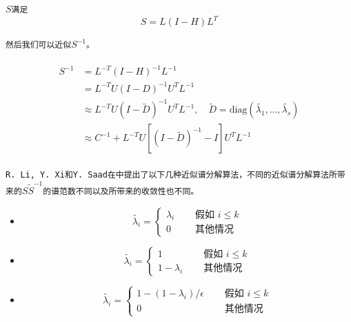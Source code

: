 \documentclass[11pt, a4paper]{article}
\theoremstyle{plain}
\theoremstyle{plain}
\theoremstyle{plain}
\theoremstyle{definition}
\theoremstyle{remark}
\theoremstyle{definition}
\newcommand{\T}[1]{\texttt{#1}}
\begin{document}
\T{$S$满足} 
\begin{equation}
	S = L(I - H)L^T
\end{equation}

\T{然后我们可以近似$S^{-1}$\cite{SLR}。}	

\begin{gather}
	\begin{aligned}
		S^{-1} &= L^{-T} (I - H)^{-1}L^{-1} \\ &= L^{-T} U (I - D)^{-1} U^T L^{-1} \\
		&\approx L^{-T} U (I - \tilde{D})^{-1} U^T L^{-1} ,\quad \tilde{D} = \text{diag}(\tilde{\lambda_1}, \ldots, \tilde{\lambda_s}) \\
		&\approx C^{-1} + L^{-T} U[(I - \tilde{D})^{-1} - I]U^TL^{-1}
	\end{aligned}
\end{gather}

\T{R. Li, Y. Xi和Y. Saad在\cite{SLR}中提出了以下几种近似谱分解算法，不同的近似谱分解算法所带来的$S \tilde{S}^{-1}$的谱范数不同以及所带来的收敛性也不同。}
\begin{multicols}{2}
	\begin{itemize}
		\item
		\begin{equation}
			\nonumber
			\tilde{\lambda_i} = \begin{cases}
				\lambda_i \quad &\T{ 假如 } i \leq k \\
				0 \quad &\T{ 其他情况}
			\end{cases}
		\end{equation}
		
		\item
		\begin{equation}
			\nonumber
			\tilde{\lambda_i} = \begin{cases}
				1 \quad & \T{ 假如 } i \leq k \\
				1 - \lambda_i \quad & \T{ 其他情况}
			\end{cases}
		\end{equation}
		
		\item
		\begin{equation}
			\nonumber
			\tilde{\lambda_i} = \begin{cases}
				1 - (1 - \lambda_i) / \epsilon \quad & \T{ 假如 } i \leq k \\
				0 \quad & \T{ 其他情况}
			\end{cases}
		\end{equation}
	\end{itemize}
\end{multicols}
\end{document}
